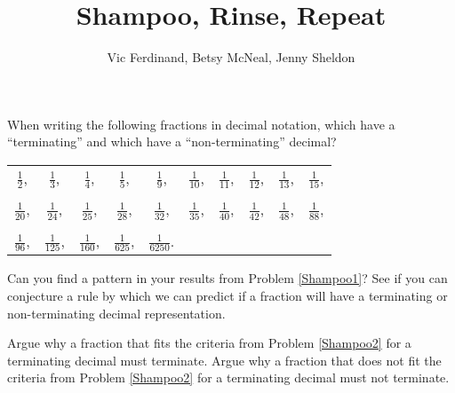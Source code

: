 \documentclass[nooutcomes]{ximera}
\title{Shampoo, Rinse, Repeat}
\author{Vic Ferdinand, Betsy McNeal, Jenny Sheldon}
\begin{document}
\begin{abstract} \end{abstract}
\maketitle


\begin{problem}\label{Shampoo1}

When writing the following fractions in decimal notation, which have a
``terminating'' and which have a ``non-terminating'' decimal?


\vspace*{0.5cm}

\begin{tabular}{c c c c c c c c c c}

$\displaystyle \frac{1}{2}$, & $\displaystyle \frac{1}{3}$, & $\displaystyle \frac{1}{4}$, & $\displaystyle \frac{1}{5}$, & $\displaystyle \frac{1}{9}$, & $\displaystyle \frac{1}{10}$, & $\displaystyle \frac{1}{11}$, & $\displaystyle \frac{1}{12}$, & $\displaystyle \frac{1}{13}$, & $\displaystyle \frac{1}{15}$,\\
\\
$\displaystyle \frac{1}{20}$, & $\displaystyle \frac{1}{24}$, & $\displaystyle \frac{1}{25}$, & $\displaystyle \frac{1}{28}$, & $\displaystyle \frac{1}{32}$, & $\displaystyle \frac{1}{35}$, & $\displaystyle \frac{1}{40}$, & $\displaystyle \frac{1}{42}$, & $\displaystyle \frac{1}{48}$, & $\displaystyle \frac{1}{88}$,\\
\\
$\displaystyle \frac{1}{96}$, & $\displaystyle \frac{1}{125}$, & $\displaystyle \frac{1}{160}$, & $\displaystyle \frac{1}{625}$, & $\displaystyle \frac{1}{6250}$.\\

\end{tabular}
\end{problem}

\begin{problem}\label{Shampoo2}
Can you find a pattern in your results from Problem \ref{Shampoo1}? See if you can
conjecture a rule by which we can predict if a fraction will have a
terminating or non-terminating decimal representation.

\end{problem}


\begin{problem}\label{Shampoo3}
Argue why a fraction that fits the criteria from Problem \ref{Shampoo2} for a
terminating decimal must terminate. Argue why a fraction that does not
fit the criteria from Problem \ref{Shampoo2} for a terminating decimal must not
terminate.
\end{problem}
\end{document}
